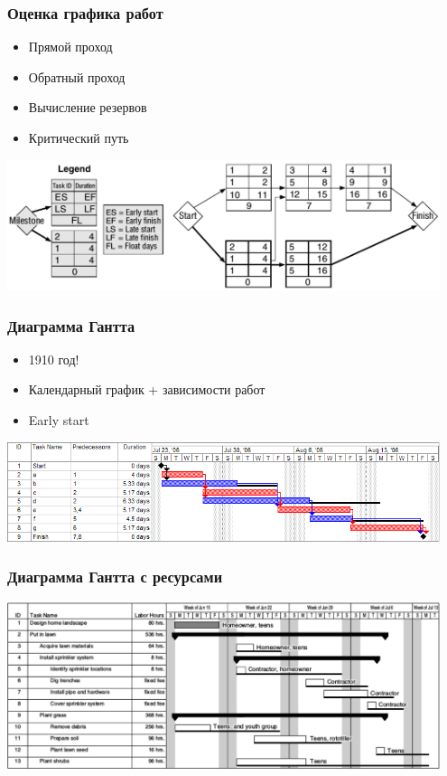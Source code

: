 \documentclass{../../slides-style}
\begin{document}
    \begin{frame}
        \frametitle{Оценка графика работ}
        \begin{itemize}
            \item Прямой проход
            \item Обратный проход
            \item Вычисление резервов
            \item Критический путь
        \end{itemize}
        \begin{center}
            \includegraphics[width=0.95\textwidth]{graphEstimate.png}
        \end{center}
    \end{frame}

    \begin{frame}
        \frametitle{Диаграмма Гантта}
        \begin{itemize}
            \item 1910 год!
            \item Календарный график + зависимости работ
            \item Early start
        \end{itemize}
        \begin{center}
            \includegraphics[width=0.95\textwidth]{ganttChart.png}
        \end{center}
    \end{frame}

    \begin{frame}
        \frametitle{Диаграмма Гантта с ресурсами}
        \begin{center}
            \includegraphics[width=0.95\textwidth]{ganttChartWithResources.png}
        \end{center}
    \end{frame}
\end{document}
